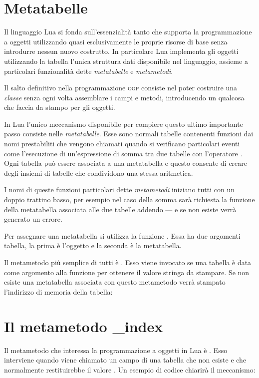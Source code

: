 \section{Metatabelle}

Il linguaggio Lua si fonda sull'essenzialità tanto che supporta la
programmazione a oggetti utilizzando quasi esclusivamente le proprie risorse di
base senza introdurre nessun nuovo costrutto. In particolare Lua implementa gli
oggetti utilizzando la tabella l'unica struttura dati disponibile nel
linguaggio, assieme a particolari funzionalità dette \emph{metatabelle} e
\emph{metametodi}.

Il salto definitivo nella programmazione \textsc{oop} consiste nel poter
costruire una \emph{classe} senza ogni volta assemblare i campi e metodi,
introducendo un qualcosa che faccia da stampo per gli oggetti.

In Lua l'unico meccanismo disponibile per compiere questo ultimo importante
passo consiste nelle \emph{metatabelle}. Esse sono normali tabelle contenenti
funzioni dai nomi prestabiliti che vengono chiamati quando si verificano
particolari eventi come l'esecuzione di un'espressione di somma tra due tabelle
con l'operatore \key{+}. Ogni tabella può essere associata a una metatabella e
questo consente di creare degli insiemi di tabelle che condividono una stessa
aritmetica.

I nomi di queste funzioni particolari dette \emph{metametodi} iniziano tutti
con un doppio trattino basso, per esempio nel caso della somma sarà richiesta
la funzione  della metatabella associata alle due tabelle addendo
--- e se non esiste verrà generato un errore.

Per assegnare una metatabella si utilizza la funzione . Essa
ha due argomenti tabella, la prima è l'oggetto e la seconda è la metatabella.

Il metametodo più semplice di tutti è . Esso viene
invocato se una tabella è data come argomento alla funzione  per
ottenere il valore stringa da stampare. Se non esiste una metatabella
associata con questo metametodo verrà stampato l'indirizzo di memoria della
tabella:


\section{Il metametodo \_index}

Il metametodo che interessa la programmazione a oggetti in Lua è
. Esso interviene quando viene chiamato un campo di una tabella
che non esiste e che normalmente restituirebbe il valore . Un esempio
di codice chiarirà il meccanismo:

